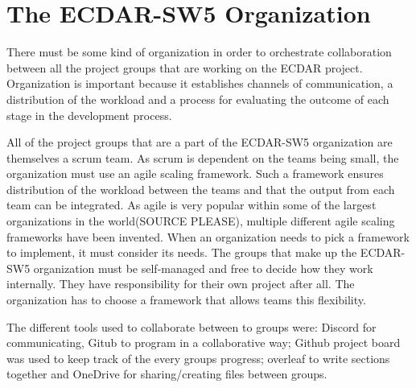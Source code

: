 \section{The ECDAR-SW5 Organization}
There must be some kind of organization in order to orchestrate collaboration between all the project groups that are working on the ECDAR project. 
Organization is important because it establishes channels of communication, a distribution of the workload and a process for evaluating the outcome of each stage in the development process.

All of the project groups that are a part of the ECDAR-SW5 organization are themselves a scrum team. 
As scrum is dependent on the teams being small, the organization must use an agile scaling framework. 
Such a framework ensures distribution of the workload between the teams and that the output from each team can be integrated. 
As agile is very popular within some of the largest organizations in the world(SOURCE PLEASE), multiple different agile scaling frameworks have been invented. 
When an organization needs to pick a framework to implement, it must consider its needs. 
The groups that make up the ECDAR-SW5 organization must be self-managed and free to decide how they work internally. They have responsibility for their own project after all. The organization has to choose a framework that allows teams this flexibility.




The different tools used to collaborate between to groups were: Discord for communicating, Gitub to program in a collaborative way; Github project board was used to keep track of the every groups progress; overleaf to write sections together and OneDrive for sharing/creating files between groups. 
